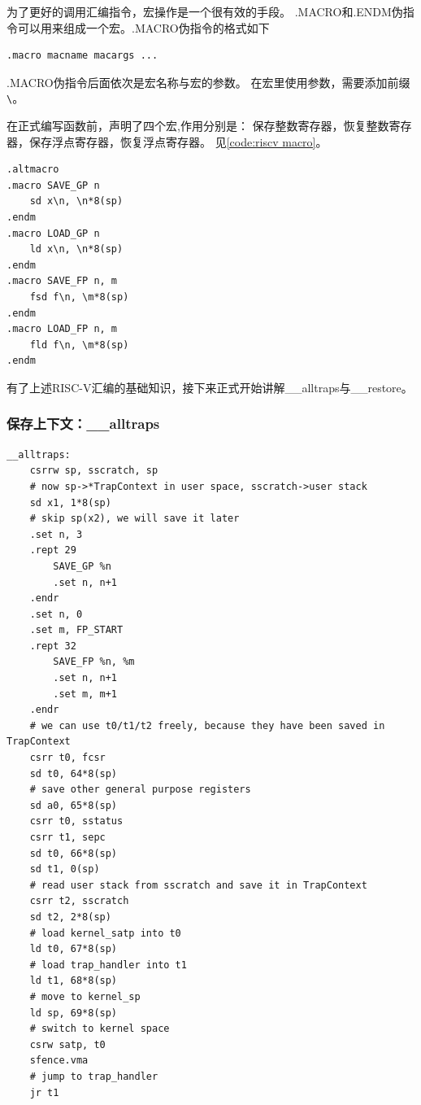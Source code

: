 为了更好的调用汇编指令，宏操作是一个很有效的手段。
.MACRO和.ENDM伪指令可以用来组成一个宏。.MACRO伪指令的格式如下

\begin{lstlisting}[]
.macro macname macargs ...
\end{lstlisting}

.MACRO伪指令后面依次是宏名称与宏的参数。
在宏里使用参数，需要添加前缀\lstinline`\`。

在正式编写函数前，声明了四个宏,作用分别是：
保存整数寄存器，恢复整数寄存器，保存浮点寄存器，恢复浮点寄存器。
见\autoref{code:riscv macro}。

\begin{lstlisting}[language={riscv}, label={code:riscv macro},
    caption={RISC-V宏}]
.altmacro
.macro SAVE_GP n
    sd x\n, \n*8(sp)
.endm
.macro LOAD_GP n
    ld x\n, \n*8(sp)
.endm
.macro SAVE_FP n, m
    fsd f\n, \m*8(sp)
.endm
.macro LOAD_FP n, m
    fld f\n, \m*8(sp)
.endm
\end{lstlisting}

有了上述RISC-V汇编的基础知识，接下来正式开始讲解__alltraps与__restore。

\subsubsection{保存上下文：__alltraps}

\begin{lstlisting}[language={riscv}, label={code:alltraps},
    caption={__alltraps}]
__alltraps:
    csrrw sp, sscratch, sp
    # now sp->*TrapContext in user space, sscratch->user stack
    sd x1, 1*8(sp)
    # skip sp(x2), we will save it later
    .set n, 3
    .rept 29
        SAVE_GP %n
        .set n, n+1
    .endr
    .set n, 0
    .set m, FP_START
    .rept 32
        SAVE_FP %n, %m
        .set n, n+1
        .set m, m+1
    .endr
    # we can use t0/t1/t2 freely, because they have been saved in TrapContext
    csrr t0, fcsr
    sd t0, 64*8(sp)
    # save other general purpose registers
    sd a0, 65*8(sp)
    csrr t0, sstatus
    csrr t1, sepc
    sd t0, 66*8(sp)
    sd t1, 0(sp)
    # read user stack from sscratch and save it in TrapContext
    csrr t2, sscratch
    sd t2, 2*8(sp)
    # load kernel_satp into t0
    ld t0, 67*8(sp)
    # load trap_handler into t1
    ld t1, 68*8(sp)
    # move to kernel_sp
    ld sp, 69*8(sp)
    # switch to kernel space
    csrw satp, t0
    sfence.vma
    # jump to trap_handler
    jr t1
\end{lstlisting}

